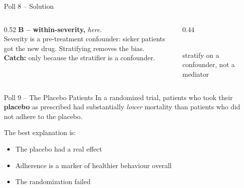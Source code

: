 \documentclass[aspectratio=169]{beamer}
\begin{document}
\begin{frame}{Poll 8 \;--\; Solution}
  \small
  \begin{columns}[T]
    \begin{column}{0.52\textwidth}
      \textcolor{good}{\textbf{B -- within-severity,}} \emph{here}.\\[0.4em]
      Severity is a pre-treatment confounder: sicker patients got the new drug.
      Stratifying removes the bias.\\[0.3em]
      \textcolor{brick}{\textbf{Catch:}} only because the stratifier is a confounder.
    \end{column}
    \begin{column}{0.44\textwidth}
      \centering
      \\[0.3em]
      {\scriptsize stratify on a confounder, not a mediator}
    \end{column}
  \end{columns}
\end{frame}

\begin{frame}{Poll 9 \;--\; The Placebo Patients}
  \small
  In a randomized trial, patients who took their \textbf{placebo} as prescribed
  had substantially \emph{lower} mortality than patients who did not adhere to
  the placebo.
  \vspace{0.8em}

  The best explanation is:
  \begin{itemize}
    \item[\textbf{A.}] The placebo had a real effect
    \item[\textbf{B.}] Adherence is a marker of healthier behaviour overall
    \item[\textbf{C.}] The randomization failed
  \end{itemize}
\end{frame}
\end{document}
